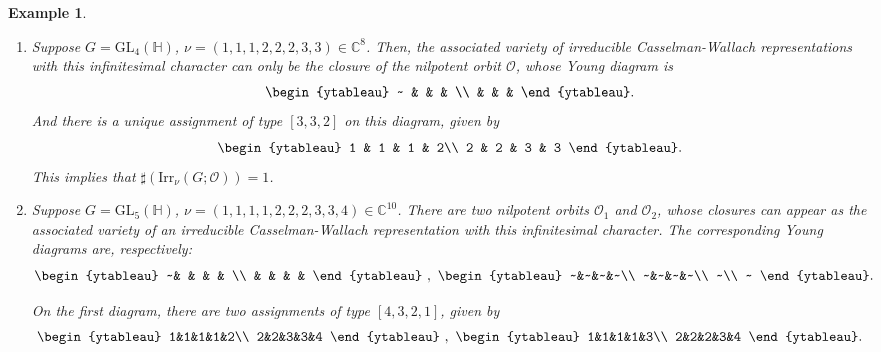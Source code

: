\documentclass[12pt, a4paper]{amsart}
\numberwithin{equation}{section}
\newtheorem{examp}[thm]{Example}
\newcommand{\BC}{{\mathbb {C}}}
\newcommand{\BH}{{\mathbb {H}}}
\newcommand{\CO}{{\mathcal {O}}}
\newcommand{\GL}{{\mathrm{GL}}}
\newcommand{\Irr}{{\mathrm{Irr}}}
\begin{document}
\begin{examp}
    \begin{enumerate}
    \item  Suppose $G = \GL_{4}(\BH)$, $\nu = (1,1,1,2,2,2,3,3) \in \BC^{8}$.
           Then, the associated variety of irreducible Casselman-Wallach representations with this infinitesimal character can only be the closure of the nilpotent orbit $\CO$, whose Young diagram is
           \[
                \begin{ytableau}
                ~ & & & \\
                 & & & 
                \end{ytableau}.
           \]
            And there is a unique assignment of type $[3,3,2]$ on this diagram, given by
            \[
                \begin{ytableau}
                    1 & 1 & 1 & 2\\
                    2 & 2 & 3 & 3
                \end{ytableau}.
            \]
            This implies that $\sharp(\Irr_{\nu}(G;\CO)) = 1$.

    \item   Suppose $G = \GL_{5}(\BH)$, $\nu = (1,1,1,1,2,2,2,3,3,4) \in \BC^{10}$.       
            There are two nilpotent orbits $\CO_1$ and $\CO_2$, whose closures can appear as the associated variety of an irreducible Casselman-Wallach representation with this infinitesimal character. The corresponding Young diagrams are, respectively:
            \[
                \begin{ytableau}
                    ~& & & & \\
                    & & & &
                \end{ytableau}
                ~,~
                \begin{ytableau}
                    ~&~&~&~\\
                    ~&~&~&~\\
                    ~\\
                    ~
                \end{ytableau}.
            \]
            
            On the first diagram, there are two assignments of type $[4,3,2,1]$, given by
            \[
                \begin{ytableau}
                    1&1&1&1&2\\
                    2&2&3&3&4
                \end{ytableau}
                ~,~
                \begin{ytableau}
                    1&1&1&1&3\\
                    2&2&2&3&4
                \end{ytableau}.
            \]
            

\end{enumerate}
\end{examp}
\end{document}
